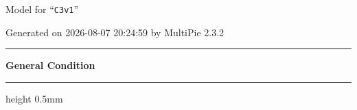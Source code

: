\documentclass[fleqn,10pt,landscape]{jsarticle}
\begin{document}
\setcounter{MaxMatrixCols}{32}

\renewcommand{\tablename}{Table~}
\renewcommand{\figurename}{Figure~}
\setlength{\baselineskip}{16pt}
\setlength{\parindent}{0pt}
\setlength{\mathindent}{0pt}
\footnotesize
\begin{center}
\LARGE
Model for ``\texttt{C3v1}''
\end{center}
\begin{flushright}
Generated on 2026-08-07 20:24:59 by MultiPie 2.3.2
\end{flushright}
\setlength{\baselineskip}{16pt}
\footnotesize
\vspace{5mm}
\noindent \rule[0.5mm]{5mm}{0.5mm}\hspace{3mm}\textbf{General Condition}\hspace{3mm}\leaders\hrule height 0.5mm\hfill\kern0pt
\vspace{3mm}
\end{document}
